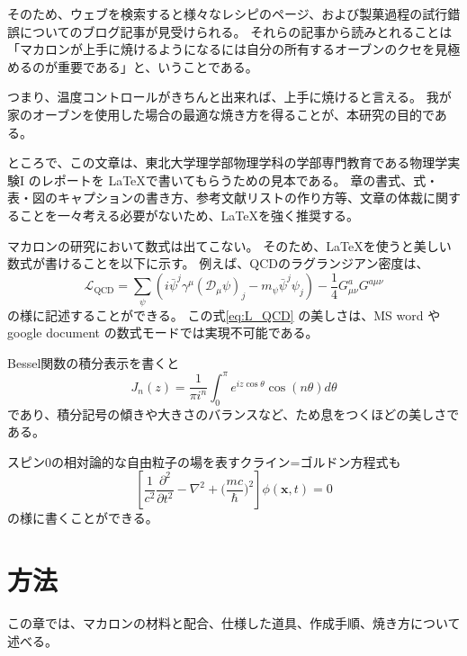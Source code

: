 \documentclass[uplatex,dvipdfmx,a4j,12pt]{jsarticle}
\begin{document}
そのため、ウェブを検索すると様々なレシピのページ、および製菓過程の試行錯誤についてのブログ記事が見受けられる。
それらの記事から読みとれることは「マカロンが上手に焼けるようになるには自分の所有するオーブンのクセを見極めるのが重要である」と、いうことである。

つまり、温度コントロールがきちんと出来れば、上手に焼けると言える。
我が家のオーブンを使用した場合の最適な焼き方を得ることが、本研究の目的である。

ところで、この文章は、東北大学理学部物理学科の学部専門教育である物理学実験I のレポートを \LaTeX で書いてもらうための見本である。
章の書式、式・表・図のキャプションの書き方、参考文献リストの作り方等、文章の体裁に関することを一々考える必要がないため、\LaTeX を強く推奨する。

マカロンの研究において数式は出てこない。
そのため、\LaTeX を使うと美しい数式が書けることを以下に示す。
例えば、QCDのラグランジアン密度は、
\begin{equation}
    \mathcal{L}_\text{QCD} =\sum_\psi \left( i\bar\psi^j \gamma^\mu (\mathcal{D}_\mu\psi)_j -m_\psi\bar\psi^j \psi_j \right)-\frac{1}{4}G^a_{\mu\nu} G^{a\mu\nu}
    \label{eq:L_QCD} %
\end{equation}
の様に記述することができる。
この式\eqref{eq:L_QCD} の美しさは、MS word や google document の数式モードでは実現不可能である。

Bessel関数の積分表示を書くと
\begin{equation*}    
    J_n ( z ) = \frac{ 1 }{ \pi i^n } \int_0^\pi e^{i z \cos \theta} \cos (n \theta) d\theta
\end{equation*}
であり、積分記号の傾きや大きさのバランスなど、ため息をつくほどの美しさである。

スピン0の相対論的な自由粒子の場を表すクライン=ゴルドン方程式も
\begin{equation*}
    \left [
        \frac{1}{c^2}\frac{\partial^2}{\partial t^2}
        - \nabla^2+\biggl ( \frac{mc}{\hbar} \biggr )^2
    \right ]
    \phi(\boldsymbol{x},t) = 0
\end{equation*}
の様に書くことができる。



\section{方法}

この章では、マカロンの材料と配合、仕様した道具、作成手順、焼き方について述べる。
\end{document}

